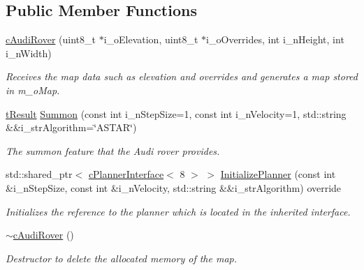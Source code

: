 \subsection*{Public Member Functions}
\begin{DoxyCompactItemize}
\item 
\mbox{\hyperlink{classplanner_1_1c_audi_rover_abafb926aca93fb8382284a10bd341986}{c\+Audi\+Rover}} (uint8\+\_\+t $\ast$i\+\_\+o\+Elevation, uint8\+\_\+t $\ast$i\+\_\+o\+Overrides, int i\+\_\+n\+Height, int i\+\_\+n\+Width)
\begin{DoxyCompactList}\small\item\em Receives the map data such as elevation and overrides and generates a map stored in m\+\_\+o\+Map. \end{DoxyCompactList}\item 
\mbox{\hyperlink{structt_result}{t\+Result}} \mbox{\hyperlink{classplanner_1_1c_audi_rover_a09a9f9ff21d3b139db7c2990a5989674}{Summon}} (const int i\+\_\+n\+Step\+Size=1, const int i\+\_\+n\+Velocity=1, std\+::string \&\&i\+\_\+str\+Algorithm=\char`\"{}A\+S\+T\+AR\char`\"{})
\begin{DoxyCompactList}\small\item\em The summon feature that the Audi rover provides. \end{DoxyCompactList}\item 
\mbox{\label{classplanner_1_1c_audi_rover_a892dfcdf781ccdfe95f5af808f5a24ac}} 
std\+::shared\+\_\+ptr$<$ \mbox{\hyperlink{classplanner_1_1c_planner_interface}{c\+Planner\+Interface}}$<$ 8 $>$ $>$ \mbox{\hyperlink{classplanner_1_1c_audi_rover_a892dfcdf781ccdfe95f5af808f5a24ac}{Initialize\+Planner}} (const int \&i\+\_\+n\+Step\+Size, const int \&i\+\_\+n\+Velocity, std\+::string \&\&i\+\_\+str\+Algorithm) override
\begin{DoxyCompactList}\small\item\em Initializes the reference to the planner which is located in the inherited interface. \end{DoxyCompactList}\item 
\mbox{\label{classplanner_1_1c_audi_rover_a9057332995c0ac8a286551345aee9cc7}} 
\mbox{\hyperlink{classplanner_1_1c_audi_rover_a9057332995c0ac8a286551345aee9cc7}{$\sim$c\+Audi\+Rover}} ()
\begin{DoxyCompactList}\small\item\em Destructor to delete the allocated memory of the map. \end{DoxyCompactList}\item 

\end{DoxyCompactItemize}
